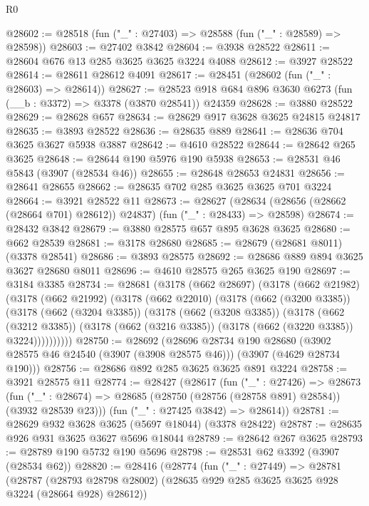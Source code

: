 \begin{lexlean}{R0}
\begin{coremodule}
@28602 := @28518 (fun ("_" : @27403) => @28588 (fun ("_" : @28589) => @28598))
@28603 := @27402 @3842
@28604 := @3938 @28522
@28611 := @28604 @676 @13 @285 @3625 @3625 @3224 @4088
@28612 := @3927 @28522
@28614 := @28611 @28612 @4091
@28617 := @28451 (@28602 (fun ("_" : @28603) => @28614))
@28627 := @28523 @918 @684 @896 @3630 @6273 (fun (__b : @3372) => @3378 (@3870 @28541)) @24359
@28628 := @3880 @28522
@28629 := @28628 @657
@28634 := @28629 @917 @3628 @3625 @24815 @24817
@28635 := @3893 @28522
@28636 := @28635 @889
@28641 := @28636 @704 @3625 @3627 @5938 @3887
@28642 := @4610 @28522
@28644 := @28642 @265 @3625
@28648 := @28644 @190 @5976 @190 @5938
@28653 := @28531 @46 @5843 (@3907 (@28534 @46))
@28655 := @28648 @28653 @24831
@28656 := @28641 @28655
@28662 := @28635 @702 @285 @3625 @3625 @701 @3224
@28664 := @3921 @28522 @11
@28673 := @28627
    (@28634 (@28656 (@28662 (@28664 @701) @28612)) @24837)
    (fun ("_" : @28433) => @28598)
@28674 := @28432 @3842
@28679 := @3880 @28575 @657 @895 @3628 @3625
@28680 := @662 @28539
@28681 := @3178 @28680
@28685 := @28679 (@28681 @8011) (@3378 @28541)
@28686 := @3893 @28575
@28692 := @28686 @889 @894 @3625 @3627 @28680 @8011
@28696 := @4610 @28575 @265 @3625 @190
@28697 := @3184 @3385
@28734 := @28681
    (@3178
      (@662 @28697)
      (@3178
        (@662 @21982)
        (@3178
          (@662 @21992)
          (@3178
            (@662 @22010)
            (@3178
              (@662 (@3200 @3385))
              (@3178
                (@662 (@3204 @3385))
                (@3178
                  (@662 (@3208 @3385))
                  (@3178
                    (@662 (@3212 @3385))
                    (@3178 (@662 (@3216 @3385)) (@3178 (@662 (@3220 @3385)) @3224))))))))))
@28750 := @28692
    (@28696
      @28734
      @190
      @28680
      (@3902 @28575 @46 @24540 (@3907 (@3908 @28575 @46)))
      (@3907 (@4629 @28734 @190)))
@28756 := @28686 @892 @285 @3625 @3625 @891 @3224
@28758 := @3921 @28575 @11
@28774 := @28427
    (@28617
      (fun ("_" : @27426) =>
      @28673
        (fun ("_" : @28674) => @28685 (@28750 (@28756 (@28758 @891) @28584)) (@3932 @28539 @23)))
      (fun ("_" : @27425 @3842) => @28614))
@28781 := @28629 @932 @3628 @3625 (@5697 @18044) (@3378 @28422)
@28787 := @28635 @926 @931 @3625 @3627 @5696 @18044
@28789 := @28642 @267 @3625
@28793 := @28789 @190 @5732 @190 @5696
@28798 := @28531 @62 @3392 (@3907 (@28534 @62))
@28820 := @28416
    (@28774
      (fun ("_" : @27449) =>
      @28781
        (@28787
          (@28793 @28798 @28002)
          (@28635 @929 @285 @3625 @3625 @928 @3224 (@28664 @928) @28612))

\end{coremodule}
\end{lexlean}
